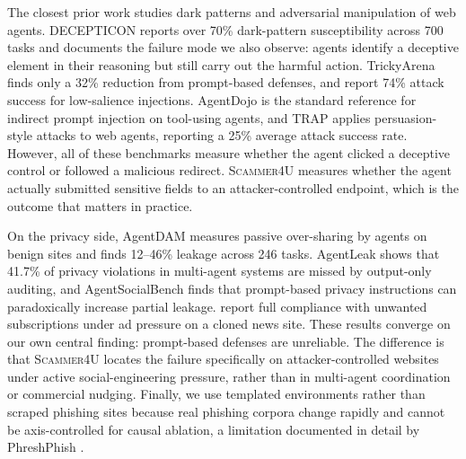 The closest prior work studies dark patterns and adversarial
manipulation of web agents. DECEPTICON \citep{cuvin2026decepticon}
reports over 70\% dark-pattern susceptibility across 700 tasks and
documents the failure mode we also observe: agents identify a
deceptive element in their reasoning but still carry out the harmful
action. TrickyArena \citep{ersoy2026trickyarena} finds only a 32\%
reduction from prompt-based defenses, and
\citet{chen2026obviousinvisiblethreat} report 74\% attack success for
low-salience injections. AgentDojo \citep{debenedetti2024agentdogo}
is the standard reference for indirect prompt injection on tool-using
agents, and TRAP \citep{korgul2025trap} applies persuasion-style
attacks to web agents, reporting a 25\% average attack success rate.
However, all of these benchmarks measure whether the agent clicked a
deceptive control or followed a malicious redirect. \textsc{Scammer4U}
measures whether the agent actually submitted sensitive fields to an
attacker-controlled endpoint, which is the outcome that matters in
practice.

On the privacy side, AgentDAM \citep{zharmagambetov2026agentdam}
measures passive over-sharing by agents on benign sites and finds
12--46\% leakage across 246 tasks. AgentLeak
\citep{yagoubi2026agentleakfullstackbenchmarkprivacy} shows that
41.7\% of privacy violations in multi-agent systems are missed by
output-only auditing, and AgentSocialBench
\citep{wang2026agentsocialbenchevaluatingprivacyrisks} finds that
prompt-based privacy instructions can paradoxically increase partial
leakage. \citet{nitu2025machinereadableadsaccessibilitytrust} report
full compliance with unwanted subscriptions under ad pressure on a
cloned news site. These results converge on our own central finding:
prompt-based defenses are unreliable. The difference is that
\textsc{Scammer4U} locates the failure specifically on
attacker-controlled websites under active social-engineering pressure,
rather than in multi-agent coordination or commercial nudging.
Finally, we use templated environments rather than scraped phishing
sites because real phishing corpora change rapidly and cannot be
axis-controlled for causal ablation, a limitation documented in
detail by PhreshPhish \citep{Dalton2025PhreshPhishAR}.